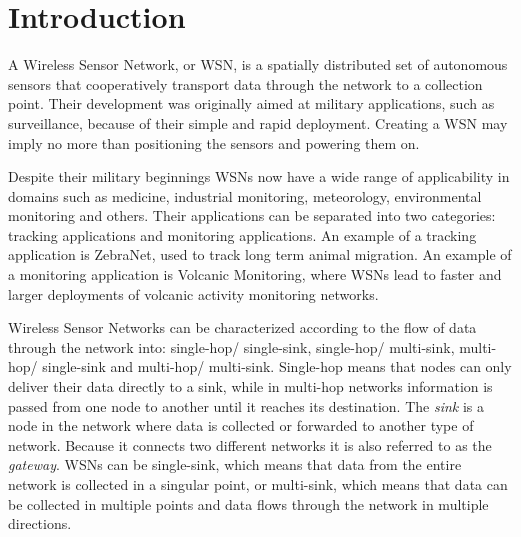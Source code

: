 
\chapter{Introduction}

A Wireless Sensor Network, or WSN, is a spatially distributed set of autonomous
sensors that cooperatively transport data through the network to a collection
point. Their development was originally aimed at military applications, such as
surveillance, because of their simple and rapid deployment. Creating a WSN may
imply no more than positioning the sensors and powering them on.

Despite their military beginnings WSNs now have a wide range of applicability
in domains such as medicine, industrial monitoring, meteorology, environmental
monitoring and others. Their applications can be separated into two categories:
tracking applications and monitoring applications. An example of a tracking
application is ZebraNet\cite{zhang2004hardware}, used to track long term animal
migration. An example of a monitoring application is Volcanic
Monitoring\cite{werner2006deploying}, where WSNs lead to faster and larger
deployments of volcanic activity monitoring networks.

Wireless Sensor Networks can be characterized according to the flow of data
through the network into: single-hop/ single-sink, single-hop/ multi-sink,
multi-hop/ single-sink and multi-hop/ multi-sink. Single-hop means that nodes
can only deliver their data directly to a sink, while in multi-hop networks
information is passed from one node to another until it reaches its
destination. The \emph{sink} is a node in the network where data is collected
or forwarded to another type of network. Because it connects two different
networks it is also referred to as the \emph{gateway}. WSNs can be single-sink,
which means that data from the entire network is collected in a singular point,
or multi-sink, which means that data can be collected in multiple points and
data flows through the network in multiple directions.

